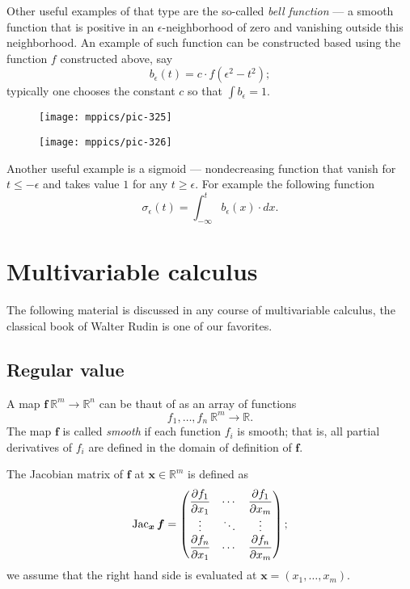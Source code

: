 Other useful examples of that type are the so-called \emph{bell function} --- a smooth function that is positive in an $\epsilon$-neighborhood of zero and vanishing outside this neighborhood.
An example of such function can be constructed based using the function $f$ constructed above, say 
\[b_\epsilon(t)=c\cdot f(\epsilon^2-t^2);\]
typically one chooses the constant $c$ so that $\int b_\epsilon=1$.

\begin{figure}[h!]
\begin{minipage}{.48\textwidth}
\centering
\texttt{[image: mppics/pic-325]}
\end{minipage}\hfill
\begin{minipage}{.48\textwidth}
\centering
\texttt{[image: mppics/pic-326]}
\end{minipage}
\end{figure}

Another useful example is a sigmoid --- nondecreasing function that vanish for $t\le -\epsilon$ and takes value $1$ for any $t\ge \epsilon$.
For example the following function \label{page:sigma-function}
\[\sigma_\epsilon(t)
=
\int_{-\infty}^t b_\epsilon(x)\cdot dx.\]



\section{Multivariable calculus}

The following material is discussed in any course of multivariable calculus, the classical book of Walter Rudin \cite{rudin} is one of our favorites.

\subsection*{Regular value}

A map $\bm{f}\:\mathbb{R}^m\to\mathbb{R}^n$ can be thaut of as an array of functions 
\[f_1,\dots,f_n\:\mathbb{R}^m\to \mathbb{R}.\]
The map $\bm{f}$ is called \emph{smooth} if each function $f_i$ is smooth;
that is, all partial derivatives of $f_i$ are defined in the domain of definition of $\bm{f}$.

The Jacobian matrix of $\bm{f}$ at $\bm{x}\in\mathbb{R}^m$ is defined as
\[\mathop{\rm Jac}\nolimits_{\bm{x}}\bm{f}=
\begin{pmatrix}
\dfrac{\partial f_1}{\partial x_1} & \cdots & \dfrac{\partial f_1}{\partial x_m}\\
\vdots & \ddots & \vdots\\
\dfrac{\partial f_n}{\partial x_1} & \cdots & \dfrac{\partial f_n}{\partial x_m} \end{pmatrix};\]
we assume that the right hand side is evaluated at $\bm{x}=(x_1,\dots,x_m)$.

